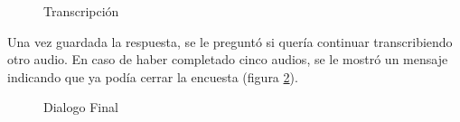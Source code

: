 \begin{figure}
\begin{center}
\end{center}
\caption{Transcripción}
\label{transcripcion}
\end{figure}

Una vez guardada la respuesta, se le preguntó si quería continuar transcribiendo otro audio. En caso de haber completado cinco audios, se le mostró un mensaje indicando que ya podía cerrar la encuesta (figura \ref{continuar}).

\begin{figure}
\begin{center}
\end{center}
\caption{Dialogo Final}
\label{continuar}
\end{figure}